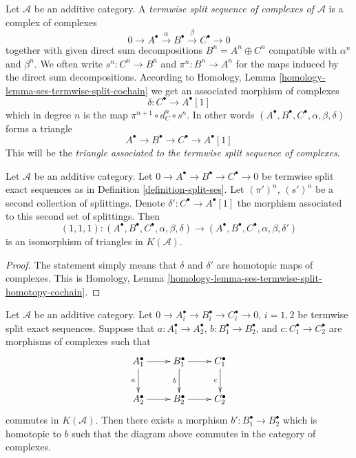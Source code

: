 \begin{definition}
\label{definition-split-ses}
Let $\mathcal{A}$ be an additive category.
A {\it termwise split sequence of complexes of $\mathcal{A}$}
is a complex of complexes
$$
0 \to
A^\bullet \xrightarrow{\alpha}
B^\bullet \xrightarrow{\beta}
C^\bullet \to 0
$$
together with given direct sum decompositions
$B^n = A^n \oplus C^n$
compatible with $\alpha^n$ and $\beta^n$.
We often write $s^n : C^n \to B^n$ and $\pi^n : B^n \to A^n$
for the maps induced by the direct sum decompositions.
According to
Homology, Lemma \ref{homology-lemma-ses-termwise-split-cochain}
we get an associated morphism of complexes
$$
\delta : C^\bullet \longrightarrow A^\bullet[1]
$$
which in degree $n$ is the map $\pi^{n + 1} \circ d_C^n \circ s^n$.
In other words
$(A^\bullet, B^\bullet, C^\bullet, \alpha, \beta, \delta)$
forms a triangle
$$
A^\bullet \to B^\bullet \to C^\bullet \to A^\bullet[1]
$$
This will be the {\it triangle associated to the termwise
split sequence of complexes}.
\end{definition}

\begin{lemma}
\label{lemma-triangle-independent-splittings}
Let $\mathcal{A}$ be an additive category. Let
$0 \to A^\bullet \to B^\bullet \to C^\bullet \to 0$
be termwise split exact sequences as in
Definition \ref{definition-split-ses}.
Let $(\pi')^n$, $(s')^n$ be a second collection of splittings.
Denote $\delta' : C^\bullet \longrightarrow A^\bullet[1]$ the
morphism associated to this second set of splittings.
Then
$$
(1, 1, 1) :
(A^\bullet, B^\bullet, C^\bullet, \alpha, \beta, \delta)
\longrightarrow
(A^\bullet, B^\bullet, C^\bullet, \alpha, \beta, \delta')
$$
is an isomorphism of triangles in $K(\mathcal{A})$.
\end{lemma}

\begin{proof}
The statement simply means that $\delta$ and $\delta'$ are
homotopic maps of complexes. This is
Homology, Lemma \ref{homology-lemma-ses-termwise-split-homotopy-cochain}.
\end{proof}

\begin{lemma}
\label{lemma-make-commute}
Let $\mathcal{A}$ be an additive category.
Let $0 \to A_i^\bullet \to B_i^\bullet \to C_i^\bullet \to 0$, $i = 1, 2$
be termwise split exact sequences. Suppose that
$a : A_1^\bullet \to A_2^\bullet$,
$b : B_1^\bullet \to B_2^\bullet$, and
$c : C_1^\bullet \to C_2^\bullet$ are morphisms of complexes
such that
$$
\xymatrix{
A_1^\bullet \ar[d]_a \ar[r] &
B_1^\bullet \ar[r] \ar[d]_b &
C_1^\bullet \ar[d]_c \\
A_2^\bullet \ar[r] & B_2^\bullet \ar[r] & C_2^\bullet
}
$$
commutes in $K(\mathcal{A})$. Then there exists a morphism
$b' : B_1^\bullet \to B_2^\bullet$
which is homotopic to $b$ such that the diagram above commutes
in the category of complexes.
\end{lemma}

